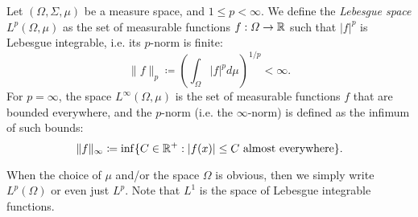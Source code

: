 \begin{definition}
    Let $(\Omega, \Sigma, \mu)$ be a measure space, and $1\leq p<\infty$. We define the \emph{Lebesgue space} $L^p(\Omega,\mu)$ as the set of measurable functions $f:\Omega\to \mathbb{R}$ such that $|f|^p$ is Lebesgue integrable, i.e. its $p$-norm is finite:
    \begin{equation*}
        \|f\|_p \coloneqq \left(\int_\Omega |f|^p d\mu\right)^{1/p} < \infty.
    \end{equation*}
    For $p=\infty$, the space $L^\infty(\Omega,\mu)$ is the set of measurable functions $f$ that are bounded everywhere, and the $p$-norm (i.e. the $\infty$-norm) is defined as the infimum of such bounds: 
    \begin{equation*}
        \|f\|_\infty \coloneqq \inf\{C\in\mathbb{R}^+: |f(x)|\leq C \text{ almost everywhere}\}.
    \end{equation*}

    When the choice of $\mu$ and/or the space $\Omega$ is obvious, then we simply write $L^p(\Omega)$ or even just $L^p$. Note that $L^1$ is the space of Lebesgue integrable functions.
\end{definition}

